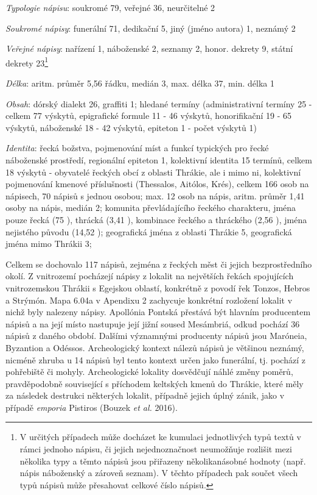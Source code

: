 {\em Typologie nápisu}: soukromé 79, veřejné 36, neurčitelné 2

{\em Soukromé nápisy}: funerální 71, dedikační 5, jiný (jméno autora) 1, neznámý 2

{\em Veřejné nápisy}: nařízení 1, náboženské 2, seznamy 2, honor. dekrety 9, státní dekrety 23\footnote{V určitých případech může docházet ke kumulaci jednotlivých typů textů v rámci jednoho nápisu, či jejich nejednoznačnost neumožňuje rozlišit mezi několika typy a těmto nápisů jsou přiřazeny několikanásobné hodnoty (např. nápis náboženský a zároveň seznam). V těchto případech pak součet všech typů nápisů může přesahovat celkové číslo nápisů.}

{\em Délka}: aritm. průměr 5,56 řádku, medián 3, max. délka 37, min. délka 1

{\em Obsah}: dórský dialekt 26, graffiti 1; hledané termíny (administrativní termíny 25 - celkem 77 výskytů, epigrafické formule 11 - 46 výskytů, honorifikační 19 - 65 výskytů, náboženské 18 - 42 výskytů, epiteton 1 - počet výskytů 1)

{\em Identita}: řecká božstva, pojmenování míst a funkcí typických pro řecké náboženské prostředí, regionální epiteton 1, kolektivní identita 15 termínů, celkem 18 výskytů - obyvatelé řeckých obcí z oblasti Thrákie, ale i mimo ni, kolektivní pojmenování kmenové příslušnosti (Thessalos, Aitólos, Krés), celkem 166 osob na nápisech, 70 nápisů s jednou osobou; max. 12 osob na nápis, aritm. průměr 1,41 osoby na nápis, medián 2; komunita převládajícího řeckého charakteru, jména pouze řecká (75 ), thrácká (3,41 ), kombinace řeckého a thráckého (2,56 ), jména nejistého původu (14,52 ); geografická jména z oblasti Thrákie 5, geografická jména mimo Thrákii 3;

\NC\AR
\HL
\HL
\stoptable

Celkem se dochovalo 117 nápisů, zejména z řeckých měst či jejich bezprostředního okolí. Z vnitrozemí pocházejí nápisy z lokalit na největších řekách spojujících vnitrozemskou Thrákii s Egejskou oblastí, konkrétně z povodí řek Tonzos, Hebros a Strýmón. Mapa 6.04a v Apendixu 2 zachycuje konkrétní rozložení lokalit v nichž byly nalezeny nápisy. Apollónia Pontská přestává být hlavním producentem nápisů a na její místo nastupuje její jižní soused Mesámbriá, odkud pochází 36  nápisů z daného období. Dalšími významnými producenty nápisů jsou Maróneia, Byzantion a Odéssos. Archeologický kontext nálezů nápisů je většinou neznámý, nicméně zhruba u 14 nápisů byl tento kontext určen jako funerální, tj. pochází z pohřebiště či mohyly. Archeologické lokality dosvědčují náhlé změny poměrů, pravděpodobně související s příchodem keltských kmenů do Thrákie, které měly za následek destrukci některých lokalit, případně jejich úplný zánik, jako v případě {\em emporia} Pistiros (Bouzek {\em et al.} 2016).

